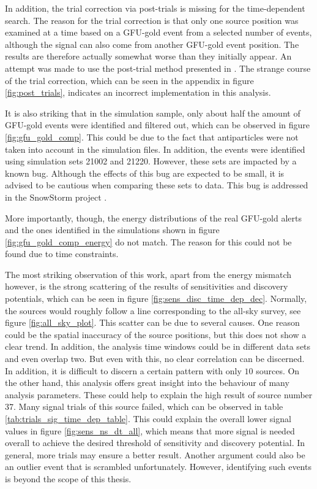 In addition, the trial correction via post-trials is missing for the time-dependent search.
The reason for the trial correction is that only one source position was examined at a time based on a GFU-gold event from a selected number of events, although the signal can also come from another GFU-gold event position.
The results are therefore actually somewhat worse than they initially appear.
An attempt was made to use the post-trial method presented in \cite{thorben}.
The strange course of the trial correction, which can be seen in the appendix in figure \ref{fig:post_trials}, indicates an incorrect implementation in this analysis.

It is also striking that in the simulation sample, only about half the amount of GFU-gold events were identified and filtered out, which can be observed in figure \ref{fig:gfu_gold_comp}.
This could be due to the fact that antiparticles were not taken into account in the simulation files.
In addition, the events were identified using simulation sets 21002 and 21220.
However, these sets are impacted by a known bug.
Although the effects of this bug are expected to be small, it is advised to be cautious when comparing these sets to data.
This bug is addressed in the SnowStorm project \cite{snowstorm}.

More importantly, though, the energy distributions of the real GFU-gold alerts and the ones identified in the simulations shown in figure \ref{fig:gfu_gold_comp_energy} do not match.
The reason for this could not be found due to time constraints.

The most striking observation of this work, apart from the energy mismatch however, is the strong scattering of the results of sensitivities and discovery potentials, which can be seen in figure \ref{fig:sens_disc_time_dep_dec}.
Normally, the sources would roughly follow a line corresponding to the all-sky survey, see figure \ref{fig:all_sky_plot}.
This scatter can be due to several causes.
One reason could be the spatial inaccuracy of the source positions, but this does not show a clear trend.
In addition, the analysis time windows could be in different data sets and even overlap two.
But even with this, no clear correlation can be discerned.
In addition, it is difficult to discern a certain pattern with only $\num{10}$ sources.
On the other hand, this analysis offers great insight into the behaviour of many analysis parameters.
These could help to explain the high result of source number $\num{37}$.
Many signal trials of this source failed, which can be observed in table \ref{tab:trials_sig_time_dep_table}.
This could explain the overall lower signal values in figure \ref{fig:sens_ns_dt_all}, which means that more signal is needed overall to achieve the desired threshold of sensitivity and discovery potential.
In general, more trials may ensure a better result.
Another argument could also be an outlier event that is scrambled unfortunately.
However, identifying such events is beyond the scope of this thesis.

